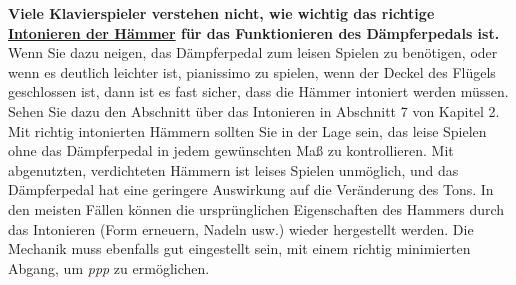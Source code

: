 \textbf{Viele Klavierspieler verstehen nicht, wie wichtig das richtige \hyperlink{c2_7_hamm}{Intonieren der Hämmer} für das Funktionieren des Dämpferpedals ist.}
Wenn Sie dazu neigen, das Dämpferpedal zum leisen Spielen zu benötigen, oder wenn es deutlich leichter ist, pianissimo zu spielen, wenn der Deckel des Flügels geschlossen ist, dann ist es fast sicher, dass die Hämmer intoniert werden müssen.
Sehen Sie dazu den Abschnitt über das Intonieren in Abschnitt 7 von Kapitel 2.
Mit richtig intonierten Hämmern sollten Sie in der Lage sein, das leise Spielen ohne das Dämpferpedal in jedem gewünschten Maß zu kontrollieren.
Mit abgenutzten, verdichteten Hämmern ist leises Spielen unmöglich, und das Dämpferpedal hat eine geringere Auswirkung auf die Veränderung des Tons.
In den meisten Fällen können die ursprünglichen Eigenschaften des Hammers durch das Intonieren (Form erneuern, Nadeln usw.) wieder hergestellt werden.
Die Mechanik muss ebenfalls gut eingestellt sein, mit einem richtig minimierten Abgang, um \textit{ppp} zu ermöglichen.

